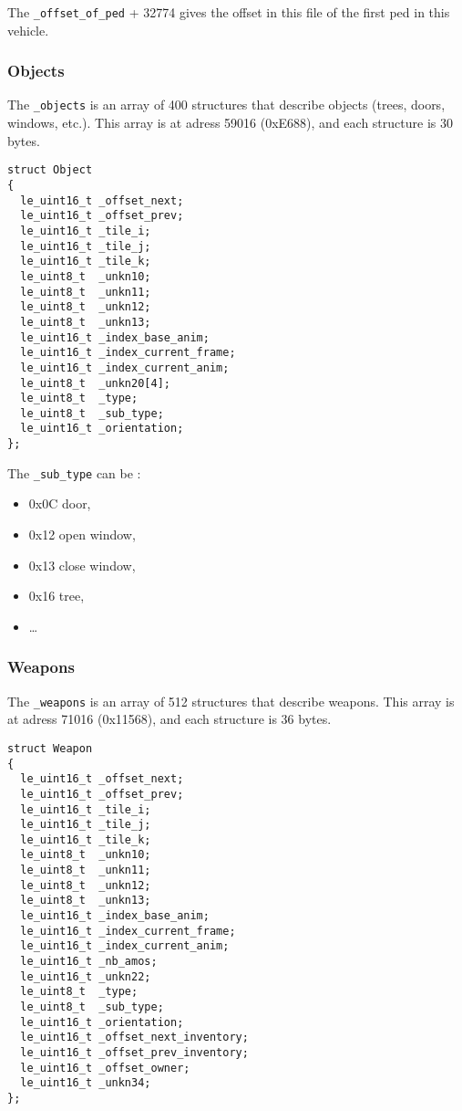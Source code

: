 \documentclass[a4paper,twoside,12pt,dvips]{article}
\begin{document}
The \texttt{\_offset\_of\_ped} + 32774 gives the offset in this file of the first ped in this vehicle.


\subsubsection{Objects}
\label{sec:objects}

The \texttt{\_objects} is an array of 400 structures that describe objects (trees, doors, windows, etc.). This array is at adress 59016 (0xE688), and each structure is 30 bytes.

\begin{lstlisting}
struct Object
{
  le_uint16_t _offset_next;
  le_uint16_t _offset_prev;
  le_uint16_t _tile_i;
  le_uint16_t _tile_j;
  le_uint16_t _tile_k;
  le_uint8_t  _unkn10;
  le_uint8_t  _unkn11;
  le_uint8_t  _unkn12;
  le_uint8_t  _unkn13;
  le_uint16_t _index_base_anim;
  le_uint16_t _index_current_frame;
  le_uint16_t _index_current_anim;
  le_uint8_t  _unkn20[4];
  le_uint8_t  _type;
  le_uint8_t  _sub_type;
  le_uint16_t _orientation;
};
\end{lstlisting}

The \texttt{\_sub\_type} can be : 
\begin{itemize}
\item 0x0C door,
\item 0x12 open window,
\item 0x13 close window,
\item 0x16 tree,
\item \dots
\end{itemize}

\subsubsection{Weapons}
\label{sec:weapons}

The \texttt{\_weapons} is an array of 512 structures that describe weapons. This array is at adress 71016 (0x11568), and each structure is 36 bytes.

\begin{lstlisting}
struct Weapon
{
  le_uint16_t _offset_next;
  le_uint16_t _offset_prev;
  le_uint16_t _tile_i;
  le_uint16_t _tile_j;
  le_uint16_t _tile_k;
  le_uint8_t  _unkn10;
  le_uint8_t  _unkn11;
  le_uint8_t  _unkn12;
  le_uint8_t  _unkn13;
  le_uint16_t _index_base_anim;
  le_uint16_t _index_current_frame;
  le_uint16_t _index_current_anim;
  le_uint16_t _nb_amos;
  le_uint16_t _unkn22;
  le_uint8_t  _type;
  le_uint8_t  _sub_type;
  le_uint16_t _orientation;
  le_uint16_t _offset_next_inventory;
  le_uint16_t _offset_prev_inventory;
  le_uint16_t _offset_owner;
  le_uint16_t _unkn34;
};
\end{lstlisting}
\end{document}
